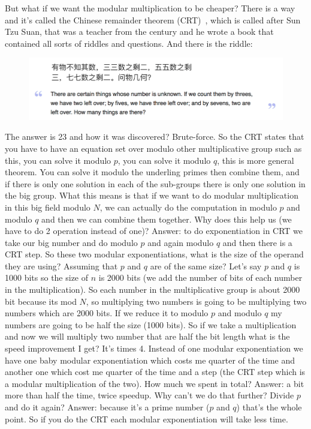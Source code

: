 But what if we want the modular multiplication to be cheaper? There is a way and
it's called the Chinese remainder theorem (CRT)~\cite{dingyi1996chinese}, which
is called after Sun Tzu Suan, that was a teacher from the  century and he
wrote a book that contained all sorts of riddles and questions. And there is the
riddle: 

\begin{figure}[!ht]
    \centering
    \includegraphics[scale=0.8]{images/chapter_3/CRT.png} \label{fig:crt}
\end{figure}

The answer is 23 and how it was discovered? Brute-force. So the CRT states that
you have to have an equation set over modulo other multiplicative group such as
this, you can solve it modulo $p$, you can solve it modulo $q$, this is more
general theorem. You can solve it modulo the underling primes then combine them,
and if there is only one solution in each of the sub-groups there is only one
solution in the big group. What this means is that if we want to do modular
multiplication in this big field modulo $N$, we can actually do the computation
in modulo $p$ and modulo $q$ and then we can combine them together. Why does
this help us (we have to do 2 operation instead of one)? Answer: to do
exponentiation in CRT we take our  big number and do modulo $p$ and again modulo
$q$ and then there is a CRT step. So these two modular exponentiations, what is
the size of the operand they are using? Assuming that $p$ and $q$ are of the
same size? Let's say $p$ and $q$ is 1000 bits so the size of $n$ is 2000 bits
(we add the number of bits of each number in the multiplication).  So each
number in the multiplicative group is about 2000 bit because its mod $N$, so
multiplying two numbers is going to be multiplying two numbers which are 2000
bits. If we reduce it to modulo $p$ and modulo $q$ my numbers are going to be
half the size (1000 bits). So if we take a multiplication and now we will
multiply two number that are half the bit length what is the speed improvement I
get? It's times 4. Instead of one modular exponentiation we have one baby
modular exponentiation which costs me quarter of the time and another one which
cost me quarter of the time and a step (the CRT step which is a modular
multiplication of the two). How much we spent in total? Answer: a bit more than
half the time, twice speedup. Why can't we do that further? Divide $p$ and do it
again? Answer: because it's a prime number ($p$ and $q$) that's the whole point.
So if you do the CRT each modular exponentiation will take less time. 

